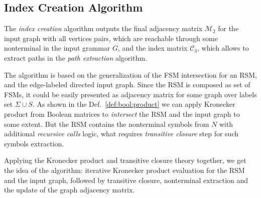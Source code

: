\subsection{Index Creation Algorithm}

The \textit{index creation} algorithm outputs the final adjacency matrix $\mathcal{M}_2$
for the input graph with all vertices pairs, which are reachable through some nonterminal 
in the input grammar $G$, and the index matrix $\mathcal{C}_3$, which allows to extract
paths in the \textit{path extraction} algorithm.

The algorithm is based on the generalization of the FSM intersection for an RSM, 
and the edge-labeled directed input graph. Since the RSM is composed as set of FSMs, 
it could be easily presented as adjacency matrix for some graph over labels set 
$\Sigma \cup S$. As shown in the Def.~\ref{def:bool:product} we can apply 
Kronecker product from Boolean matrices to \textit{intersect} the RSM and the 
input graph to some extent. But the RSM contains the nonterminal symbols from $N$ 
with additional \textit{recursive calls} logic, what requires \textit{transitive closure} 
step for such symbols extraction.

Applying the Kronecker product and transitive closure theory together, we get the idea 
of the algorithm: iterative Kronecker product evaluation for the RSM and the input 
graph, followed by transitive closure, nonterminal extraction and the update 
of the graph adjacency matrix.



